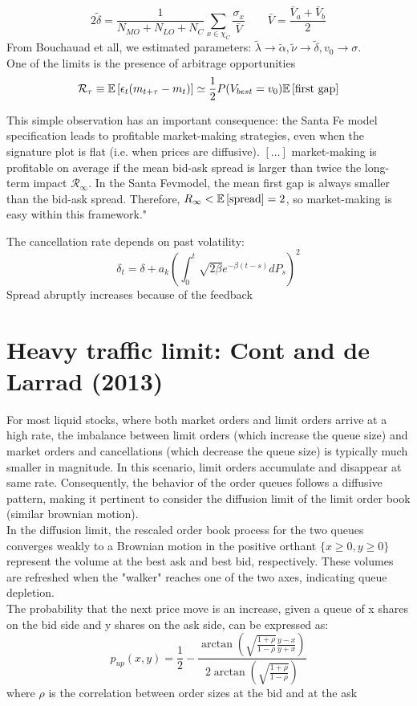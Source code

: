\[
2\tilde{\delta} = \frac{1}{N_{MO} + N_{LO} + N_{C}}\sum_{x \in \chi_C} \frac{\sigma_x}{\bar{V}} \qquad \bar{V} = \frac{\bar{V}_a + \bar{V}_b}{2}
\]
From Bouchauad et all, we estimated parameters: $\tilde{\lambda} \to \tilde{\alpha}, \tilde{\nu} \to \tilde{\delta}, v_0 \to \sigma$.\\
One of the limits is the presence of arbitrage opportunities
\[
\mathcal{R}_\tau \equiv \mathbb{E}\left[\epsilon_t (m_{t +\tau} - m_t)\right] \simeq \frac{1}{2} P (V_{best} = v_0)\mathbb{E}\left[\text{first gap}\right]
\]
\begin{myquote}
This simple observation has an important consequence: the Santa Fe model specification leads to profitable market-making strategies, even when the signature plot is flat (i.e. when prices are diffusive). $[\ldots]$ market-making is profitable on average if the mean bid-ask spread is larger than twice the long-term impact $\mathcal{R}_{\infty}$. In the Santa Fevmodel, the mean first gap is always smaller than the bid-ask spread. Therefore, $R_{\infty} < \mathbb{E}\left[\text{spread}\right]=2$, so market-making is easy within this framework."
\end{myquote}
The cancellation rate depends on past volatility:
\[
\delta_t = \delta + a_k \left(\int_0^t \sqrt{2 \beta} e^{-\beta(t-s)}dP_s\right)^2
\]
Spread abruptly increases because of the feedback
\section{Heavy traffic limit: Cont and de Larrad (2013)}
For most liquid stocks, where both market orders and limit orders arrive at a high rate, the imbalance between limit orders (which increase the queue size) and market orders and cancellations (which decrease the queue size) is typically much smaller in magnitude. In this scenario, limit orders accumulate and disappear at same rate. Consequently, the behavior of the order queues follows a diffusive pattern, making it pertinent to consider the diffusion limit of the limit order book (similar brownian motion).\\
In the diffusion limit, the rescaled order book process for the two queues converges weakly to a Brownian motion in the positive orthant $\{x \geq 0, y \geq 0\}$ represent the volume at the best ask and best bid, respectively. These volumes are refreshed when the "walker" reaches one of the two axes, indicating queue depletion.\\
The probability that the next price move is an increase, given a queue of x shares on the bid side and y shares on the ask side, can be expressed as:
\[
p_{up}(x,y) = \frac{1}{2} - \frac{\arctan\left(\sqrt{\frac{1+\rho}{1-\rho}} \frac{y-x}{y+x}\right)}{2 \arctan\left(\sqrt{\frac{1+ \rho}{1- \rho}}\right)}
\]
where $\rho$ is the correlation between order sizes at the bid and at the ask
\newpage
